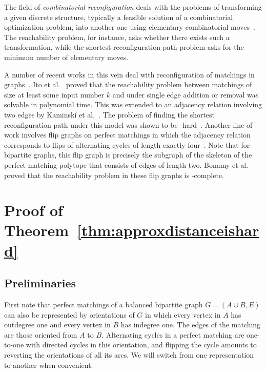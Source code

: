 \documentclass[runningheads]{llncs}
\begin{document}
The field of \emph{combinatorial reconfiguration} deals with the problems of transforming a given discrete structure, typically a feasible solution of a combinatorial optimization problem, into another one using elementary combinatorial moves~\cite{IDHPSUU11,H13,N18,GIKO22}. The reachability problem, for instance, asks whether there exists such a transformation, while the shortest reconfiguration path problem asks for the minimum number of elementary moves.

A number of recent works in this vein deal with reconfiguration of matchings in graphs~\cite{IDHPSUU11,KMM12,BBHIKMMW19,BHIM19,GKM19}. Ito et al.~\cite{IDHPSUU11} proved that the reachability problem between matchings of size at least some input number $k$ and under single edge addition or removal was solvable in polynomial time. This was extended to an adjacency relation involving two edges by Kaminsk\'i et al.~\cite{KMM12}. The problem of finding the shortest reconfiguration path under this model was shown to be \NP-hard~\cite{BHIM19,GKM19}. 
Another line of work involves flip graphs on perfect matchings in which the adjacency relation corresponds to flips of alternating cycles of length exactly four~\cite{DH98,DH02,MFHHWU09,BBHIKMMW19,CRT21}. Note that for bipartite graphs, this flip graph is precisely the subgraph of the skeleton of the perfect matching polytope that consists of edges of length two.
Bonamy et al.~\cite{BBHIKMMW19} proved that the reachability problem in these flip graphs is \PSPACE-complete.
 

\section{Proof of Theorem~\ref{thm:approxdistanceishard}}

\subsection{Preliminaries}

First note that perfect matchings of a balanced bipartite graph $G=(A\cup B,E)$ can also be represented by orientations of $G$ in which every vertex in $A$ has outdegree one and every vertex in $B$ has indegree one. The edges of the matching are those oriented from $A$ to $B$. Alternating cycles in a perfect matching are one-to-one with directed cycles in this orientation, and flipping the cycle amounts to reverting the orientations of all its arcs. We will switch from one representation to another when convenient. 
\end{document}
